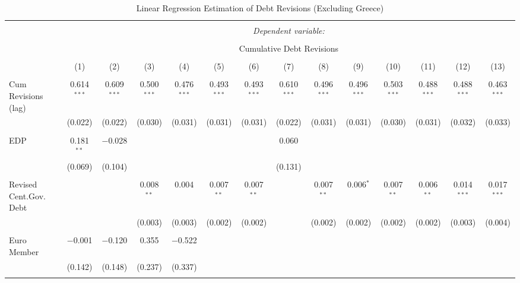 
\begin{table}[!htbp] \centering 
  \caption{Linear Regression Estimation of Debt Revisions (Excluding Greece)} 
  \label{results_no_greece} 
\tiny 
\begin{tabular}{@{\extracolsep{5pt}}lccccccccccccc} 
\\[-1.8ex]\hline 
\hline \\[-1.8ex] 
 & \multicolumn{13}{c}{\textit{Dependent variable:}} \\ 
\cline{2-14} 
\\[-1.8ex] & \multicolumn{13}{c}{Cumulative Debt Revisions} \\ 
\\[-1.8ex] & (1) & (2) & (3) & (4) & (5) & (6) & (7) & (8) & (9) & (10) & (11) & (12) & (13)\\ 
\hline \\[-1.8ex] 
 Cum Revisions (lag) & 0.614$^{***}$ & 0.609$^{***}$ & 0.500$^{***}$ & 0.476$^{***}$ & 0.493$^{***}$ & 0.493$^{***}$ & 0.610$^{***}$ & 0.496$^{***}$ & 0.496$^{***}$ & 0.503$^{***}$ & 0.488$^{***}$ & 0.488$^{***}$ & 0.463$^{***}$ \\ 
  & (0.022) & (0.022) & (0.030) & (0.031) & (0.031) & (0.031) & (0.022) & (0.031) & (0.031) & (0.030) & (0.031) & (0.032) & (0.033) \\ 
  & & & & & & & & & & & & & \\ 
 EDP & 0.181$^{**}$ & $-$0.028 &  &  &  &  & 0.060 &  &  &  &  &  &  \\ 
  & (0.069) & (0.104) &  &  &  &  & (0.131) &  &  &  &  &  &  \\ 
  & & & & & & & & & & & & & \\ 
 Revised Cent.Gov. Debt &  &  & 0.008$^{**}$ & 0.004 & 0.007$^{**}$ & 0.007$^{**}$ &  & 0.007$^{**}$ & 0.006$^{*}$ & 0.007$^{**}$ & 0.006$^{**}$ & 0.014$^{***}$ & 0.017$^{***}$ \\ 
  &  &  & (0.003) & (0.003) & (0.002) & (0.002) &  & (0.002) & (0.002) & (0.002) & (0.002) & (0.003) & (0.004) \\ 
  & & & & & & & & & & & & & \\ 
 Euro Member & $-$0.001 & $-$0.120 & 0.355 & $-$0.522 &  &  &  &  &  &  &  &  &  \\ 
  & (0.142) & (0.148) & (0.237) & (0.337) &  &  &  &  &  &  &  &  &  \\ 
  & & & & & & & & & & & & & \\ 

\end{tabular}
\end{table}
